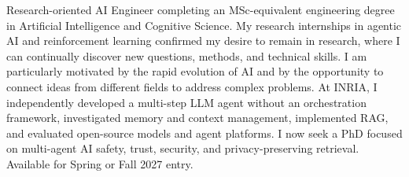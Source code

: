
\begin{cvparagraph}
Research-oriented AI Engineer completing an MSc-equivalent engineering degree in Artificial Intelligence and Cognitive Science. My research internships in agentic AI and reinforcement learning confirmed my desire to remain in research, where I can continually discover new questions, methods, and technical skills. I am particularly motivated by the rapid evolution of AI and by the opportunity to connect ideas from different fields to address complex problems. At INRIA, I independently developed a multi-step LLM agent without an orchestration framework, investigated memory and context management, implemented RAG, and evaluated open-source models and agent platforms. I now seek a PhD focused on multi-agent AI safety, trust, security, and privacy-preserving retrieval. Available for Spring or Fall 2027 entry.
\end{cvparagraph}
